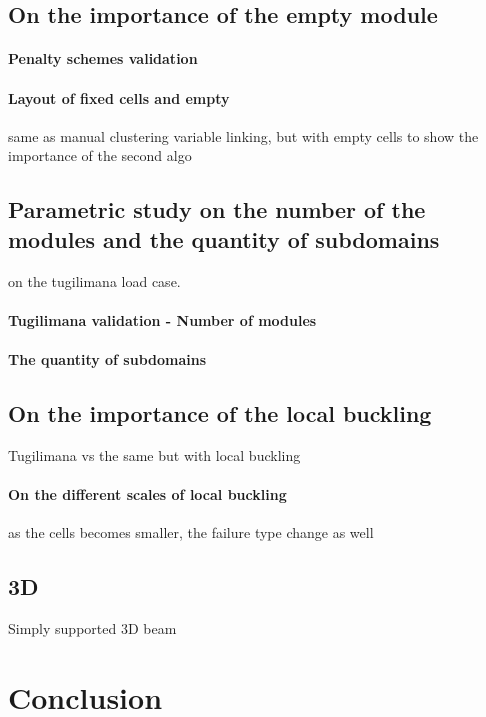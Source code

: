 \subsection{On the importance of the empty module}

\paragraph{Penalty schemes validation}

\paragraph{Layout of fixed cells and empty}
same as manual clustering variable linking, but with empty cells to show the importance of the second algo

\subsection{Parametric study on the number of the modules and the quantity of subdomains}
on the tugilimana load case. 

\paragraph{Tugilimana validation - Number of modules}

\paragraph{The quantity of subdomains}

\subsection{On the importance of the local buckling}
Tugilimana vs the same but with local buckling

\paragraph{On the different scales of local buckling}
as the cells becomes smaller, the failure type change as well

\subsection{3D}
Simply supported 3D beam

\section{Conclusion}